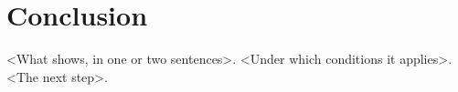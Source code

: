 \section{Conclusion}
\label{sec:conclusion}
<What \sys{} shows, in one or two sentences>. <Under which conditions it applies>. <The next step>.
